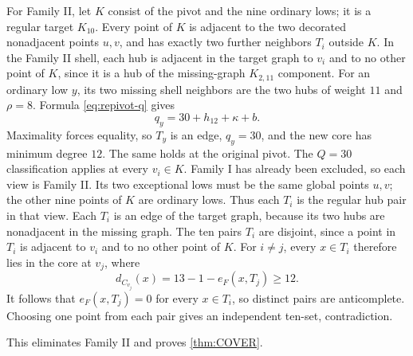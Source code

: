 For Family II, let $K$ consist of the pivot and the nine ordinary lows; it is a regular target $K_{10}$. Every point of $K$ is adjacent to the two decorated nonadjacent points $u,v$, and has exactly two further neighbors $T_i$ outside $K$. In the Family II shell, each hub is adjacent in the target graph to $v_i$ and to no other point of $K$, since it is a hub of the missing-graph $K_{2,11}$ component. For an ordinary low $y$, its two missing shell neighbors are the two hubs of weight $11$ and $\rho=8$. Formula \cref{eq:repivot-q} gives
\[
q_y=30+h_{12}+\kappa+b.
\]
Maximality forces equality, so $T_y$ is an edge, $q_y=30$, and the new core has minimum degree $12$. The same holds at the original pivot. The $Q=30$ classification applies at every $v_i\in K$. Family I has already been excluded, so each view is Family II. Its two exceptional lows must be the same global points $u,v$; the other nine points of $K$ are ordinary lows. Thus each $T_i$ is the regular hub pair in that view. Each $T_i$ is an edge of the target graph, because its two hubs are nonadjacent in the missing graph. The ten pairs $T_i$ are disjoint, since a point in $T_i$ is adjacent to $v_i$ and to no other point of $K$. For $i\ne j$, every $x\in T_i$ therefore lies in the core at $v_j$, where
\[
d_{C_{v_j}}(x)=13-1-e_F(x,T_j)\geq12.
\]
It follows that $e_F(x,T_j)=0$ for every $x\in T_i$, so distinct pairs are anticomplete. Choosing one point from each pair gives an independent ten-set, contradiction.

This eliminates Family II and proves \cref{thm:COVER}.
